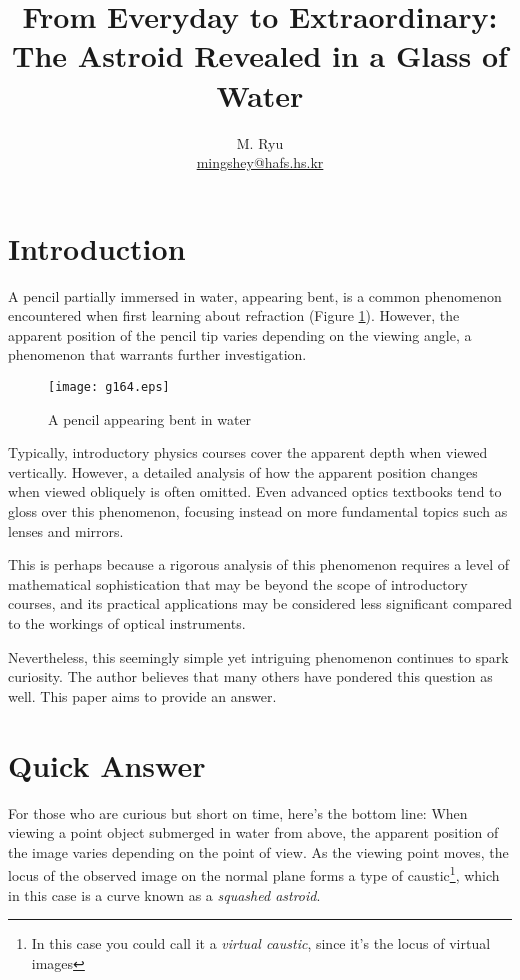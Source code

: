 \documentclass[twocolumn]{article}
\title{From Everyday to Extraordinary:\\ The Astroid Revealed in a Glass of Water}
\author{M. Ryu \\ {\href{mailto:mingshey@hafs.hs.kr}{mingshey@hafs.hs.kr}}}
\begin{document}
\maketitle
%
\newcommand{\romana}{{a}}
\newcommand{\romanb}{{b}}
\newcommand{\romanA}{{A}}
\newcommand{\romanB}{{B}}
\newcommand{\greeka}{{\alpha}}
\newcommand{\greekb}{{\beta}}
\newcommand{\Aprime}{{A^{\prime}}}
\newcommand{\Bprime}{{B^{\prime}}}
%
\section{Introduction}

A pencil partially immersed in water, appearing bent, is a common phenomenon encountered when first learning about refraction (Figure \ref{fig:pencil}). However, the apparent position of the pencil tip varies depending on the viewing angle, a phenomenon that warrants further investigation.

\begin{figure}[ht]
	\centering
	\texttt{[image: g164.eps]}
	\caption{A pencil appearing bent in water}
	\label{fig:pencil}
\end{figure}

Typically, introductory physics courses cover the apparent depth when viewed vertically. However, a detailed analysis of how the apparent position changes when viewed obliquely is often omitted. Even advanced optics textbooks tend to gloss over this phenomenon, focusing instead on more fundamental topics such as lenses and mirrors.

This is perhaps because a rigorous analysis of this phenomenon requires a level of mathematical sophistication that may be beyond the scope of introductory courses, and its practical applications may be considered less significant compared to the workings of optical instruments. 

Nevertheless, this seemingly simple yet intriguing phenomenon continues to spark curiosity. The author believes that many others have pondered this question as well. This paper aims to provide an answer.


\section{Quick Answer}

For those who are curious but short on time, here's the bottom line: When viewing a point object submerged in water from above, the apparent position of the image varies depending on the point of view. As the viewing point moves, the locus of the observed image on the normal plane forms a type of caustic\footnote{In this case you could call it a \emph{virtual caustic}, since it's the locus of virtual images}, which in this case is a curve known as a \emph{squashed astroid}.
\end{document}
